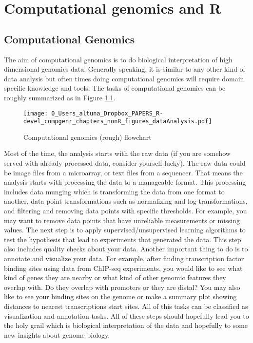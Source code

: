 \documentclass[english,nohyper]{tufte-book}\usepackage[]{graphicx}\usepackage[]{color}
\begin{document}
\chapter{Computational genomics and R}


\section{Computational Genomics}

The aim of computational genomics is to do biological interpretation
of high dimensional genomics data. Generally speaking, it is similar
to any other kind of data analysis but often times doing computational
genomics will require domain specific knowledge and tools. The tasks
of computational genomics can be roughly summarized as in Figure \ref{fig:Computational-genomics-(rough)}. 

\begin{figure}
\texttt{[image: 0\_Users\_altuna\_Dropbox\_PAPERS\_R-devel\_compgenr\_chapters\_nonR\_figures\_dataAnalysis.pdf]}\caption{Computational genomics (rough) flowchart\label{fig:Computational-genomics-(rough)}}


\end{figure}


Most of the time, the analysis starts with the raw data (if you are
somehow served with already processed data, consider yourself lucky).
The raw data could be image files from a microarray, or text files
from a sequencer. That means the analysis starts with processing the
data to a manageable format. This processing includes data munging
which is transforming the data from one format to another, data point
transformations such as normalizing and log-transformations, and filtering
and removing data points with specific thresholds. For example, you
may want to remove data points that have unreliable measurements or
missing values. The next step is to apply supervised/unsupervised
learning algorithms to test the hypothesis that lead to experiments
that generated the data. This step also includes quality checks about
your data. Another important thing to do is to annotate and visualize
your data. For example, after finding transcription factor binding
sites using data from ChIP-seq experiments, you would like to see
what kind of genes they are nearby or what kind of other genomic features
they overlap with. Do they overlap with promoters or they are distal?
You may also like to see your binding sites on the genome or make
a summary plot showing distances to nearest transcriptions start sites.
All of this tasks can be classified as visualization and annotation
tasks. All of these steps should hopefully lead you to the holy grail
which is biological interpretation of the data and hopefully to some
new insights about genome biology.
\end{document}
